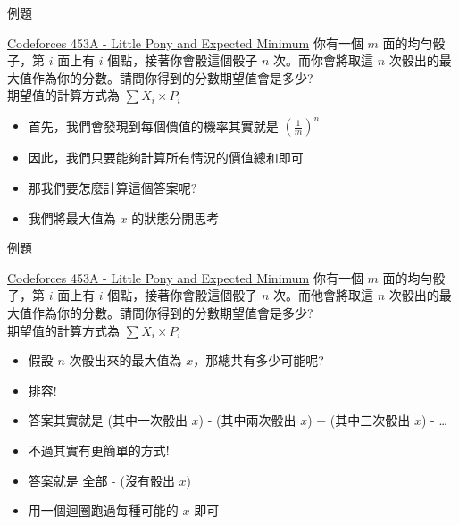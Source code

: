 \documentclass[aspectratio=169]{beamer}
\begin{document}
    \begin{frame}{例題}
        \begin{block}{\href{https://codeforces.com/problemset/problem/453/A}{Codeforces 453A - Little Pony and Expected Minimum}}
            你有一個 $m$ 面的均勻骰子，第 $i$ 面上有 $i$ 個點，接著你會骰這個骰子 $n$ 次。而你會將取這 $n$ 次骰出的最大值作為你的分數。請問你得到的分數期望值會是多少? \\
            \vspace{5mm}
            期望值的計算方式為 $\sum X_i \times P_i$
        \end{block} \pause
        \begin{itemize}
            \item<1-> 首先，我們會發現到每個價值的機率其實就是 $(\frac{1}{m})^n$
            \item<2-> 因此，我們只要能夠計算所有情況的價值總和即可
            \item<3-> 那我們要怎麼計算這個答案呢?
            \item<4-> 我們將最大值為 $x$ 的狀態分開思考
        \end{itemize}
    \end{frame}
    
    \begin{frame}{例題}
        \begin{block}{\href{https://codeforces.com/problemset/problem/453/A}{Codeforces 453A - Little Pony and Expected Minimum}}
            你有一個 $m$ 面的均勻骰子，第 $i$ 面上有 $i$ 個點，接著你會骰這個骰子 $n$ 次。而他會將取這 $n$ 次骰出的最大值作為你的分數。請問你得到的分數期望值會是多少? \\
            \vspace{5mm}
            期望值的計算方式為 $\sum X_i \times P_i$
        \end{block} \pause
        \begin{itemize}
            \item<1-> 假設 $n$ 次骰出來的最大值為 $x$，那總共有多少可能呢?
            \item<2-> 排容! 
            \item<3-> 答案其實就是 (其中一次骰出 $x$) - (其中兩次骰出 $x$) + (其中三次骰出 $x$) - \dots
            \item<4-> 不過其實有更簡單的方式! 
            \item<4-> 答案就是 全部 - (沒有骰出 $x$)
            \item<5-> 用一個迴圈跑過每種可能的 $x$ 即可
        \end{itemize}
    \end{frame}
    
\end{document}
